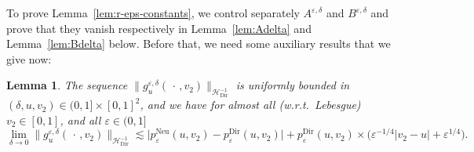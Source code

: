 \documentclass[10pt]{amsart}
\newtheorem{lemm}[theo]{Lemma}\newtheorem{prop}[theo]{Proposition}\newtheorem{coro}[theo]{Corollary}\newtheorem{conj}[theo]{Conjecture}
\theoremstyle{definition}\newtheorem{defi}[theo]{Definition}\newtheorem{rema}[theo]{Remark}\newtheorem{exam}[theo]{Example}\newtheorem{exem}[theo]{Example}\newtheorem{nota}[theo]{Notation}
\DeclareMathOperator{\Dir}{Dir}
\DeclareMathOperator{\Neu}{Neu}
\newcommand{\mc}[1]{{\mathcal #1}}
\renewcommand{\mc}[1]{{\mathcal #1}}
\begin{document}
To prove Lemma~\ref{lem:r-eps-constants}, we control separately $A^{\varepsilon, \delta}$ and $B^{\varepsilon,\delta}$ and prove that they vanish respectively in Lemma~\ref{lem:Adelta} and Lemma~\ref{lem:Bdelta} below. Before that, we need some auxiliary results that we give now:

\begin{lemm}\label{lem:g-bound}
The sequence $\| g^{\varepsilon, \delta}_u (\,\cdot\,, v_2)\|_{\mc H_{\Dir}^{- 1}}$ is uniformly bounded in $(\delta, u, v_2) \!\in (0,1] \times [0,1]^2$, and we have for almost all (w.r.t.~Lebesgue) $v_2 \in [0,1]$, and all $\varepsilon \in (0,1]$
\[
\lim_{\delta \rightarrow 0} \big\| g^{\varepsilon, \delta}_u (\,\cdot\,, v_2)
\big\|_{\mc H_{\Dir}^{- 1}} \lesssim \big| p^{\Neu}_{\varepsilon} (u, v_2) - p^{\Dir}_{\varepsilon} (u, v_2) \big| + p^{\Dir}_{\varepsilon} (u, v_2) \times \big(\varepsilon^{- 1/4} | v_2 - u | + \varepsilon^{1/4} \big).
\]
\end{lemm}
\end{document}

